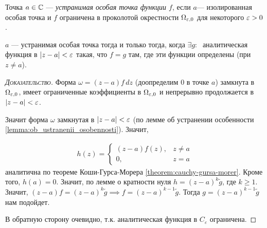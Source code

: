 \documentclass[../../main.tex]{subfiles}
\begin{document}
\begin{df}
 Точка $ a \in \mathbb{C} $ --- \textit{устранимая особая точка функции $ f $}, если $ a $--- изолированная особая точка и $ f $ ограничена в проколотой окрестности $ \Omega_{\varepsilon,0} $ для некоторого $ \varepsilon > 0 $.
\end{df}
\begin{lm}
 $ a $ --- устранимая особая точка тогда и только тогда, когда $ \exists  g  \colon\;  $ аналитическая функция в $ \left| z-a \right| < \varepsilon $ такая, что $ f=g $ там, где эти функции определены (при $ z \neq a $).
\end{lm}
\begin{proof}[\normalfont\textsc{Доказательство}]
 Форма $ \omega = (z-a)f\,dz $ (доопределим $ 0 $ в точке $ a $) замкнута в $ \Omega_{\varepsilon,0} $, имеет ограниченные коэффициенты в $ \Omega_{\varepsilon,0} $ и непрерывно продолжается в $ \left| z-a \right| < \varepsilon $.

 Значит форма $ \omega $ замкнутая в $ \left| z-a \right| < \varepsilon $ (по лемме об устранении особенности \eqref{lemma:ob_ustranenii_osobennosti}). Значит,

 \begin{align*}
	 h(z) = \begin{cases}
		 (z - a) f(z), &z \neq a \\
		 0, &z = a
	 \end{cases}
 \end{align*} аналитична по теореме Коши-Гурса-Морера \eqref{theorem:cauchy-gursa-morer}. Кроме того, $ h(a) = 0 $. Значит, по лемме о кратности нуля $ h = (z-a)^{k}\tilde g $, где $ k \geqslant 1 $. Значит, $ (z-a)f = (z-a)^{k}\tilde g \implies f = (z-a)^{k-1}\tilde g $. Тогда $ g = (z-a)^{k-1}\tilde g $ нам подойдет.

 В обратную сторону очевидно, т.к. аналитическая функция в $C_\varepsilon$ ограничена. 
\end{proof}
\end{document}
